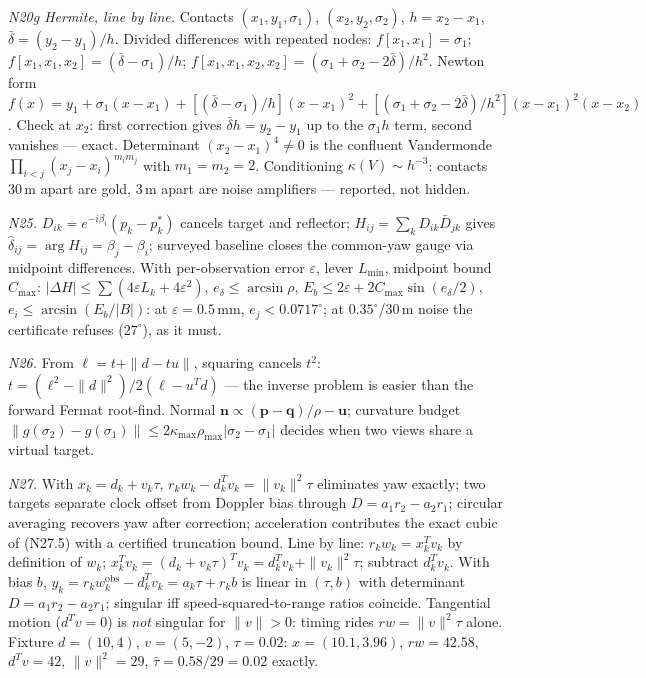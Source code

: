 \documentclass[11pt,oneside]{book}
\begin{document}
\emph{N20g Hermite, line by line.} Contacts $(x_1,y_1,\sigma_1)$,
$(x_2,y_2,\sigma_2)$, $h=x_2-x_1$, $\bar\delta=(y_2-y_1)/h$. Divided
differences with repeated nodes: $f[x_1,x_1]=\sigma_1$;
$f[x_1,x_1,x_2]=(\bar\delta-\sigma_1)/h$;
$f[x_1,x_1,x_2,x_2]=(\sigma_1+\sigma_2-2\bar\delta)/h^2$. Newton form
$f(x)=y_1+\sigma_1(x-x_1)+[(\bar\delta-\sigma_1)/h](x-x_1)^2
+[(\sigma_1+\sigma_2-2\bar\delta)/h^2](x-x_1)^2(x-x_2)$.
Check at $x_2$: first correction gives $\bar\delta h=y_2-y_1$ up to the
$\sigma_1h$ term, second vanishes --- exact. Determinant
$(x_2-x_1)^4\ne0$ is the confluent Vandermonde
$\prod_{i<j}(x_j-x_i)^{m_im_j}$ with $m_1=m_2=2$. Conditioning
$\kappa(V)\sim h^{-3}$: contacts $30\,\mathrm{m}$ apart are gold, $3\,\mathrm{m}$
apart are noise amplifiers --- reported, not hidden.

\emph{N25.} $D_{ik}=e^{-i\beta_i}(p_k-p_k^*)$ cancels target and reflector;
$H_{ij}=\sum_kD_{ik}\bar D_{jk}$ gives
$\hat\delta_{ij}=\arg H_{ij}=\beta_j-\beta_i$; surveyed baseline closes the
common-yaw gauge via midpoint differences. With per-observation error
$\varepsilon$, lever $L_{\min}$, midpoint bound $C_{\max}$:
$|\Delta H|\le\sum(4\varepsilon L_k+4\varepsilon^2)$,
$e_\delta\le\arcsin\rho$, $E_b\le2\varepsilon+2C_{\max}\sin(e_\delta/2)$,
$e_i\le\arcsin(E_b/|B|)$: at $\varepsilon=0.5\,\mathrm{mm}$,
$e_j<0.0717^\circ$; at $0.35^\circ$/30\,m noise the certificate refuses
($27^\circ$), as it must.

\emph{N26.} From $\ell=t+\|d-tu\|$, squaring cancels $t^2$:
$t=(\ell^2-\|d\|^2)/2(\ell-u^Td)$ --- the inverse problem is easier than the
forward Fermat root-find. Normal
$\mathbf{n}\propto(\mathbf{p}-\mathbf{q})/\rho-\mathbf{u}$; curvature budget
$\|g(\sigma_2)-g(\sigma_1)\|\le2\kappa_{\max}\rho_{\max}|\sigma_2-\sigma_1|$
decides when two views share a virtual target.

\emph{N27.} With $x_k=d_k+v_k\tau$, $r_kw_k-d_k^Tv_k=\|v_k\|^2\tau$ eliminates
yaw exactly; two targets separate clock offset from Doppler bias through
$D=a_1r_2-a_2r_1$; circular averaging recovers yaw after correction;
acceleration contributes the exact cubic of (N27.5) with a certified
truncation bound. Line by line: $r_kw_k=x_k^Tv_k$ by definition of $w_k$;
$x_k^Tv_k=(d_k+v_k\tau)^Tv_k=d_k^Tv_k+\|v_k\|^2\tau$; subtract $d_k^Tv_k$.
With bias $b$, $y_k=r_kw_k^{\mathrm{obs}}-d_k^Tv_k=a_k\tau+r_kb$ is linear
in $(\tau,b)$ with determinant $D=a_1r_2-a_2r_1$; singular iff
speed-squared-to-range ratios coincide. Tangential motion ($d^Tv=0$) is
\emph{not} singular for $\|v\|>0$: timing rides $rw=\|v\|^2\tau$ alone.
Fixture $d=(10,4)$, $v=(5,-2)$, $\tau=0.02$: $x=(10.1,3.96)$,
$rw=42.58$, $d^Tv=42$, $\|v\|^2=29$, $\hat\tau=0.58/29=0.02$ exactly.
\end{document}

